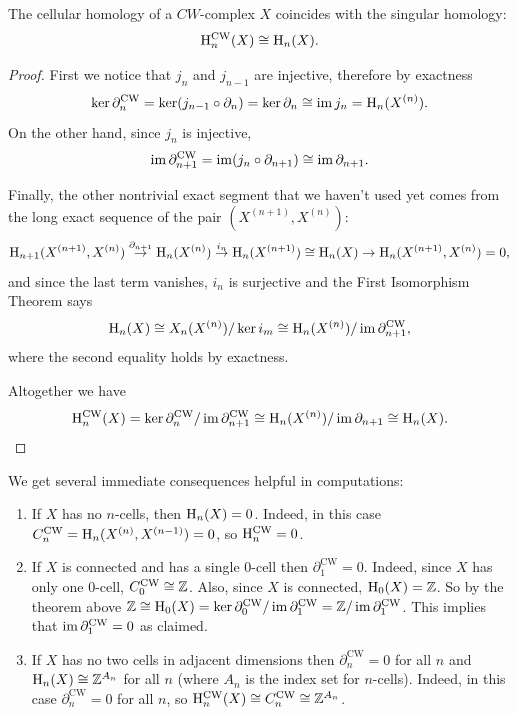\begin{thm}
    The cellular homology of a $CW$-complex $X$ coincides with the singular homology:
    \[\mathrm{H}_n^{\mathrm{CW}}(X)\cong \mathrm{H}_n(X).\]
\end{thm}
\begin{proof}
    First we notice that $j_{n}$ and $j_{n-1}$ are injective, therefore by exactness
    \[\ker\partial_n^{\mathrm{CW}}=\ker (j_{n-1}\circ\partial_n)=\ker\partial_{n}\cong \operatorname{im} j_{n}=\mathrm{H}_n(X^{(n)}).\]
    On the other hand, since $j_{n}$ is injective,
    \[\operatorname{im} \partial_{n+1}^{\mathrm{CW}}=\operatorname{im} (j_n\circ\partial_{n+1})\cong \operatorname{im} \partial_{n+1}. \]

    Finally, the other nontrivial exact segment that we haven't used yet comes from the long exact sequence of the pair $(X^{(n+1)},X^{(n)})$:
    \[\mathrm{H}_{n+1}(X^{(n+1)},X^{(n)})\overset{\partial_{n+1}}{\to} \mathrm{H}_n(X^{(n)})\overset{i_n}{\to}\mathrm{H}_n(X^{(n+1)})\cong \mathrm{H}_n(X)\to \mathrm{H}_{n}(X^{(n+1)},X^{(n)})=0,\]
    and since the last term vanishes, $i_n$ is surjective and the First Isomorphism Theorem says
    \[\mathrm{H}_n(X)\cong X_n(X^{(n)})\slash \ker i_m\cong \mathrm{H}_n(X^{(n)})\slash \operatorname{im} \partial_{n+1}^{\mathrm{CW}},\]
    where the second equality holds by exactness.
    
    Altogether we have
    \[\mathrm{H}_n^{\mathrm{CW}}(X)=\ker \partial_n^{\mathrm{CW}}\slash \operatorname{im} \partial_{n+1}^{\mathrm{CW}}\cong \mathrm{H}_n(X^{(n)})\slash \operatorname{im} \partial_{n+1}\cong \mathrm{H}_n(X).\]
\end{proof}

\begin{rem}
    We get several immediate consequences helpful in computations:
    \begin{enumerate}
        \item If $X$ has no $n$-cells, then $\mathrm{H}_n(X)=0$. Indeed, in this case $C^{\mathrm{CW}}_n=\mathrm{H}_n(X^{(n)},X^{(n-1)})=0$, so $\mathrm{H}_n^{\mathrm{CW}}=0$.
        \item If $X$ is connected and has a single $0$-cell then $\partial_1^{\mathrm{CW}}=0$. Indeed, since $X$ has only one $0$-cell, $C^{\mathrm{CW}}_0\cong \mathbb{Z}$. Also, since $X$ is connected, $\mathrm{H}_0(X)=\mathbb{Z}$. So by the theorem above $\mathbb{Z}\cong \mathrm{H}_0(X)=\ker \partial_0^{\mathrm{CW}}\slash \operatorname{im}\partial_1^{\mathrm{CW}}=\mathbb{Z}\slash \operatorname{im}\partial_1^{\mathrm{CW}}$. This implies that $\operatorname{im} \partial_1^{\mathrm{CW}}=0$ as claimed.
        \item If $X$ has no two cells in adjacent dimensions then $\partial_n^{\mathrm{CW}}=0$ for all $n$ and $\mathrm{H}_n(X)\cong \mathbb{Z}^{A_n}$ for all $n$ (where $A_n$ is the index set for $n$-cells). Indeed, in this case $\partial_n^{\mathrm{CW}}=0$ for all $n$, so $\mathrm{H}_n^{\mathrm{CW}}(X)\cong C_n^{\mathrm{CW}}\cong \mathbb{Z}^{A_n}$.
    \end{enumerate}
\end{rem}

